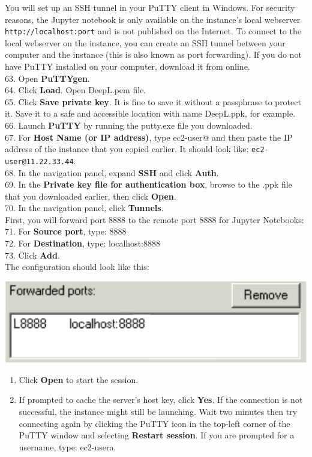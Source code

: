 \documentclass[]{book}
\providecommand{\tightlist}{%
  \setlength{\itemsep}{0pt}\setlength{\parskip}{0pt}}
\begin{document}
You will set up an SSH tunnel in your PuTTY client in Windows. For security reasons, the Jupyter notebook is only available on the instance's local webserver \texttt{http://localhost:port} and is not published on the Internet. To connect to the local webserver on the instance, you can create an SSH tunnel between your computer and the instance (this is also known as port forwarding). If you do not have PuTTY installed on your computer, download it from online.\\
63. Open \textbf{PuTTYgen}.\\
64. Click \textbf{Load}. Open DeepL.pem file.\\
65. Click \textbf{Save private key}. It is fine to save it without a passphrase to protect it. Save it to a safe and accessible location with name DeepL.ppk, for example.\\
66. Launch \textbf{PuTTY} by running the putty.exe file you downloaded.\\
67. For \textbf{Host Name (or IP address)}, type ec2-user@ and then paste the IP address of the instance that you copied earlier. It should look like: \texttt{ec2-user@11.22.33.44}.\\
68. In the navigation panel, expand \textbf{SSH} and click \textbf{Auth}.\\
69. In the \textbf{Private key file for authentication box}, browse to the .ppk file that you downloaded earlier, then click \textbf{Open}.\\
70. In the navigation panel, click \textbf{Tunnels}.\\
First, you will forward port 8888 to the remote port 8888 for Jupyter Notebooks:\\
71. For \textbf{Source port}, type: 8888\\
72. For \textbf{Destination}, type: localhost:8888\\
73. Click \textbf{Add}.\\
The configuration should look like this:

\includegraphics{./images/forward_ports.png}

\begin{enumerate}
\def\labelenumi{\arabic{enumi}.}
\setcounter{enumi}{73}
\tightlist
\item
  Click \textbf{Open} to start the session.
\item
  If prompted to cache the server's host key, click \textbf{Yes}. If the connection is not successful, the instance might still be launching. Wait two minutes then try connecting again by clicking the PuTTY icon in the top-left corner of the PuTTY window and selecting \textbf{Restart session}. If you are prompted for a username, type: ec2-usera.
\end{enumerate}
\end{document}
